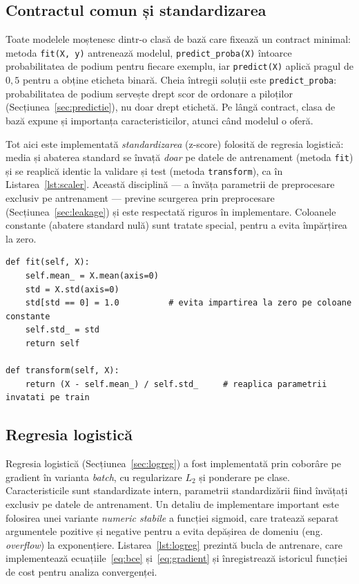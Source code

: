 \documentclass[12pt,a4paper]{report}
\begin{document}
\subsection{Contractul comun și standardizarea}

Toate modelele moștenesc dintr-o clasă de bază care fixează un contract minimal: metoda
\texttt{fit(X, y)} antrenează modelul, \texttt{predict\_proba(X)} întoarce probabilitatea de podium
pentru fiecare exemplu, iar \texttt{predict(X)} aplică pragul de $0{,}5$ pentru a obține eticheta
binară. Cheia întregii soluții este \texttt{predict\_proba}: probabilitatea de podium servește
drept scor de ordonare a piloților (Secțiunea~\ref{sec:predictie}), nu doar drept etichetă. Pe
lângă contract, clasa de bază expune și importanța caracteristicilor, atunci când modelul o oferă.

Tot aici este implementată \emph{standardizarea} (z-score) folosită de regresia logistică:
media și abaterea standard se învață \emph{doar} pe datele de antrenament (metoda \texttt{fit}) și
se reaplică identic la validare și test (metoda \texttt{transform}), ca în Listarea~\ref{lst:scaler}.
Această disciplină --- a învăța parametrii de preprocesare exclusiv pe antrenament --- previne
scurgerea prin preprocesare (Secțiunea~\ref{sec:leakage}) și este respectată riguros în
implementare. Coloanele constante (abatere standard nulă) sunt tratate special, pentru a evita
împărțirea la zero.

\begin{lstlisting}[caption={Standardizarea z-score, cu parametri invatati doar pe antrenament.}, label={lst:scaler}]
def fit(self, X):
    self.mean_ = X.mean(axis=0)
    std = X.std(axis=0)
    std[std == 0] = 1.0          # evita impartirea la zero pe coloane constante
    self.std_ = std
    return self

def transform(self, X):
    return (X - self.mean_) / self.std_     # reaplica parametrii invatati pe train
\end{lstlisting}

\subsection{Regresia logistică}

Regresia logistică (Secțiunea~\ref{sec:logreg}) a fost implementată prin coborâre pe gradient în
varianta \emph{batch}, cu regularizare $L_2$ și ponderare pe clase. Caracteristicile sunt
standardizate intern, parametrii standardizării fiind învățați exclusiv pe datele de antrenament.
Un detaliu de implementare important este folosirea unei variante \emph{numeric stabile} a funcției
sigmoid, care tratează separat argumentele pozitive și negative pentru a evita depășirea de
domeniu (eng. \emph{overflow}) la exponențiere. Listarea~\ref{lst:logreg} prezintă bucla de
antrenare, care implementează ecuațiile~\eqref{eq:bce} și~\eqref{eq:gradient} și înregistrează
istoricul funcției de cost pentru analiza convergenței.
\end{document}
